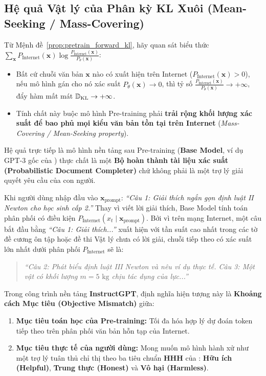 \subsection{Hệ quả Vật lý của Phân kỳ KL Xuôi (Mean-Seeking / Mass-Covering)}
Từ Mệnh đề~\ref{prop:pretrain_forward_kl}, hãy quan sát biểu thức $\sum_{\mathbf{x}} P_{\text{Internet}}(\mathbf{x}) \log \frac{P_{\text{Internet}}(\mathbf{x})}{P_\theta(\mathbf{x})}$:
\begin{itemize}[leftmargin=1.2cm]
    \item Bất cứ chuỗi văn bản $\mathbf{x}$ nào có xuất hiện trên Internet ($P_{\text{Internet}}(\mathbf{x}) > 0$), nếu mô hình gán cho nó xác suất $P_\theta(\mathbf{x}) \to 0$, thì tỷ số $\frac{P_{\text{Internet}}(\mathbf{x})}{P_\theta(\mathbf{x})} \to +\infty$, đẩy hàm mất mát $\operatorname{\mathbb{D}_{\mathrm{KL}}} \to +\infty$.
    \item Tính chất này buộc mô hình Pre-training phải \textbf{trải rộng khối lượng xác suất để bao phủ mọi kiểu văn bản tồn tại trên Internet} (\textit{Mass-Covering / Mean-Seeking property}).
\end{itemize}

Hệ quả trực tiếp là mô hình nền tảng sau Pre-training (\textbf{Base Model}, ví dụ GPT-3 gốc của \citealt{brown2020language}) thực chất là một \textbf{Bộ hoàn thành tài liệu xác suất (Probabilistic Document Completer)} chứ không phải là một trợ lý giải quyết yêu cầu của con người.

\begin{example}
Khi người dùng nhập đầu vào $\mathbf{x}_{\text{prompt}}$: \textit{``Câu 1: Giải thích ngắn gọn định luật II Newton cho học sinh cấp 2.''}
Thay vì viết lời giải thích, Base Model tính toán phân phối có điều kiện $P_{\text{Internet}}(x_{t} \mid \mathbf{x}_{\text{prompt}})$. Bởi vì trên mạng Internet, một câu bắt đầu bằng \textit{``Câu 1: Giải thích...''} xuất hiện với tần suất cao nhất trong các tờ đề cương ôn tập hoặc đề thi Vật lý chưa có lời giải, chuỗi tiếp theo có xác suất lớn nhất dưới phân phối $P_{\text{Internet}}$ sẽ là:
\begin{quote}
\textit{``Câu 2: Phát biểu định luật III Newton và nêu ví dụ thực tế. Câu 3: Một vật có khối lượng $m = 5\text{ kg}$ chịu tác dụng của lực...''}
\end{quote}
\end{example}

Trong công trình nền tảng \textbf{InstructGPT}, \citet{ouyang2022training} định nghĩa hiện tượng này là \textbf{Khoảng cách Mục tiêu (Objective Mismatch)} giữa:
\begin{enumerate}[leftmargin=1.2cm]
    \item \textbf{Mục tiêu toán học của Pre-training:} Tối đa hóa hợp lý dự đoán token tiếp theo trên phân phối văn bản hỗn tạp của Internet.
    \item \textbf{Mục tiêu thực tế của người dùng:} Mong muốn mô hình hành xử như một trợ lý tuân thủ chỉ thị theo ba tiêu chuẩn \textbf{HHH} của \citet{askell2021general}: \textbf{Hữu ích (Helpful)}, \textbf{Trung thực (Honest)} và \textbf{Vô hại (Harmless)}.
\end{enumerate}

